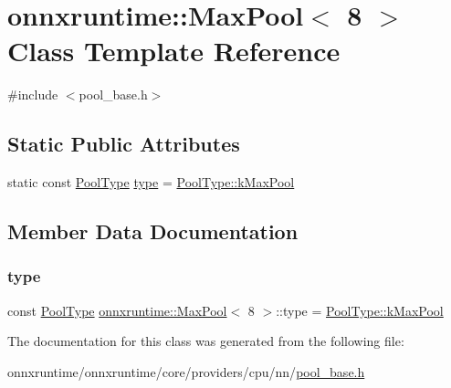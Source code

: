 \hypertarget{classonnxruntime_1_1MaxPool_3_018_01_4}{}\section{onnxruntime\+:\+:Max\+Pool$<$ 8 $>$ Class Template Reference}
\label{classonnxruntime_1_1MaxPool_3_018_01_4}


{\ttfamily \#include $<$pool\+\_\+base.\+h$>$}

\subsection*{Static Public Attributes}
\begin{DoxyCompactItemize}
\item 
static const \mbox{\hyperlink{namespaceonnxruntime_aa4ff52f19ea8c4d3e4ce3ffbabbc7060}{Pool\+Type}} \mbox{\hyperlink{classonnxruntime_1_1MaxPool_3_018_01_4_aa5abd7ac210a435bca60853ce2d53763}{type}} = \mbox{\hyperlink{namespaceonnxruntime_aa4ff52f19ea8c4d3e4ce3ffbabbc7060a5ff72b0901ac2c36434cfecb86f6d5ff}{Pool\+Type\+::k\+Max\+Pool}}
\end{DoxyCompactItemize}


\subsection{Member Data Documentation}
\mbox{\label{classonnxruntime_1_1MaxPool_3_018_01_4_aa5abd7ac210a435bca60853ce2d53763}} 
\subsubsection{\texorpdfstring{type}{type}}
{\footnotesize\ttfamily const \mbox{\hyperlink{namespaceonnxruntime_aa4ff52f19ea8c4d3e4ce3ffbabbc7060}{Pool\+Type}} \mbox{\hyperlink{classonnxruntime_1_1MaxPool}{onnxruntime\+::\+Max\+Pool}}$<$ 8 $>$\+::type = \mbox{\hyperlink{namespaceonnxruntime_aa4ff52f19ea8c4d3e4ce3ffbabbc7060a5ff72b0901ac2c36434cfecb86f6d5ff}{Pool\+Type\+::k\+Max\+Pool}}\hspace{0.3cm}{\ttfamily [static]}}



The documentation for this class was generated from the following file\+:\begin{DoxyCompactItemize}
\item 
onnxruntime/onnxruntime/core/providers/cpu/nn/\mbox{\hyperlink{pool__base_8h}{pool\+\_\+base.\+h}}\end{DoxyCompactItemize}
